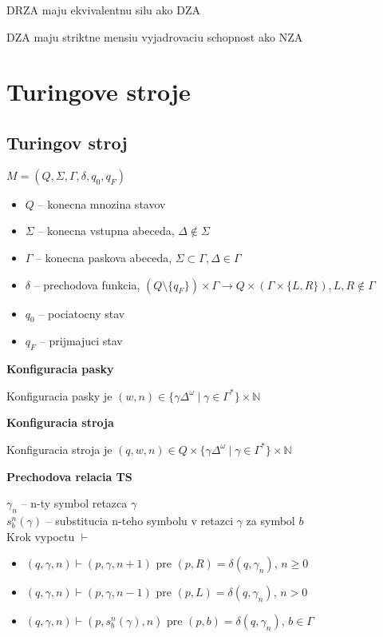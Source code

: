 \documentclass[12pt]{article}
\newcommand{\pipesep}{\hspace{3pt} \vert \hspace{3pt}}
\begin{document}
DRZA maju ekvivalentnu silu ako DZA

DZA maju striktne mensiu vyjadrovaciu schopnost ako NZA

\section{Turingove stroje}
\subsection*{Turingov stroj}
$M = (Q,\Sigma,\Gamma,\delta,q_{0},q_{F})$
\begin{itemize}
	\item $Q$ -- konecna mnozina stavov
	\item $\Sigma$ -- konecna vstupna abeceda, $\Delta \not\in \Sigma$
	\item $\Gamma$ -- konecna paskova abeceda, $\Sigma \subset \Gamma, \Delta \in \Gamma$
	\item $\delta$ -- prechodova funkcia, $(Q \setminus \{q_{F}\}) \times \Gamma \to Q \times (\Gamma \times \{L,R\}), L,R \not\in \Gamma$
	\item $q_{0}$ -- pociatocny stav
	\item $q_{F}$ -- prijmajuci stav
\end{itemize}

\textbf{Konfiguracia pasky}

Konfiguracia pasky je $(w,n) \in \{\gamma\Delta^{\omega} \pipesep \gamma \in \Gamma^{*}\} \times \mathbb{N}$

\textbf{Konfiguracia stroja}

Konfiguracia stroja je $(q,w,n) \in Q \times \{\gamma\Delta^{\omega} \pipesep \gamma \in \Gamma^{*}\} \times \mathbb{N}$

\textbf{Prechodova relacia TS}

$\gamma_{n}$ -- n-ty symbol retazca $\gamma$\\
$s^{n}_{b}(\gamma)$ -- substitucia n-teho symbolu v retazci $\gamma$ za symbol $b$ \\
Krok vypoctu $\vdash$
\begin{itemize}
	\item $(q,\gamma,n) \vdash (p,\gamma,n+1)$ pre $(p,R) = \delta(q,\gamma_{n})$, $n \ge 0$
	\item $(q,\gamma,n) \vdash (p,\gamma,n-1)$ pre $(p,L) = \delta(q,\gamma_{n})$, $n > 0$
	\item $(q,\gamma,n) \vdash (p,s^{n}_{b}(\gamma),n)$ pre $(p,b) = \delta(q,\gamma_{n})$, $b \in \Gamma$
\end{itemize}
\end{document}
